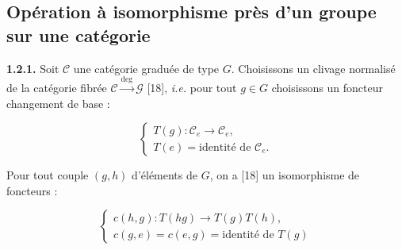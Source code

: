 \subsection{Opération à isomorphisme près d'un groupe sur une catégorie}

\noindent\textbf{1.2.1.}\quad
Soit $\mathcal C$ une catégorie graduée de type $G$. Choisissons un clivage
normalisé de la catégorie fibrée
$\mathcal C\xrightarrow{\deg}\mathcal G$ [18], \emph{i.e.} pour tout
$g\in G$ choisissons un foncteur changement de base :

\begingroup
\makeatletter
\tagsleft@true
\let\veqno\@@leqno
\makeatother
\begin{equation}
  \begin{cases}
    T(g)\colon\mathcal C_e\longrightarrow\mathcal C_e,\\[0.4em]
    T(e)=\text{identité de }\mathcal C_e.
  \end{cases}
  \tag{1.2.1.1}
\end{equation}
\endgroup

Pour tout couple $(g,h)$ d'éléments de $G$, on a [18] un isomorphisme de
foncteurs :

\begingroup
\makeatletter
\tagsleft@true
\let\veqno\@@leqno
\makeatother
\begin{equation}
  \begin{cases}
    c(h,g)\colon T(hg)\longrightarrow T(g)T(h),\\[0.4em]
    c(g,e)=c(e,g)=\text{identité de }T(g)
  \end{cases}
  \tag{1.2.1.2}
\end{equation}
\endgroup
